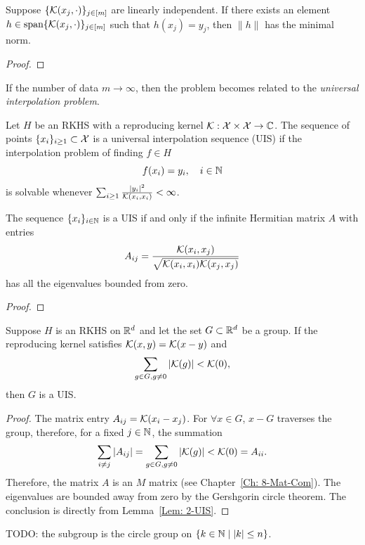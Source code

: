 \begin{theorem}
    Suppose $\{\mathcal K(x_j, \cdot)\}_{j\in [m]}$ are linearly independent. If there exists an element $h\in \textrm{span}\{ \mathcal K(x_j,\cdot)\}_{j\in[m]}$ such that $h(x_j) = y_j$, then $\|h\|$ has the minimal norm.
\end{theorem}
\begin{proof}
    
\end{proof}
If the number of data $m\to\infty$, then the problem becomes related to the \emph{universal interpolation problem}. 
\begin{definition}
    Let $H$ be an RKHS with a reproducing kernel $\mathcal K:\mathcal X\times\mathcal X\to \mathbb C$. The sequence of points $\{x_i\}_{i\ge 1}\subset \mathcal X$ is a universal interpolation sequence (UIS) if the interpolation problem of finding $f\in H$ 
    \begin{equation}
        f(x_i) = y_i,\quad i \in\mathbb N
    \end{equation}
    is solvable whenever $\sum_{i\ge 1} \frac{|y_i|^2}{\mathcal K(x_i, x_i)} < \infty$. 
\end{definition}
\begin{lemma}
\label{Lem: 2-UIS}
    The sequence $\{x_i\}_{i\in\mathbb N}$ is a UIS if and only if the infinite Hermitian matrix $A$ with entries \begin{equation}
        A_{ij} = \frac{\mathcal K(x_i, x_j)}{\sqrt{\mathcal K(x_i, x_i)\mathcal K(x_j, x_j)}}
\end{equation} has all the eigenvalues bounded from zero. 
\end{lemma}
\begin{proof}
    
\end{proof}
\begin{corollary}
    Suppose $H$ is an RKHS on $\mathbb R^d$ and let the set $G\subset \mathbb R^d$ be a group. If the reproducing kernel satisfies $\mathcal K(x, y) = \mathcal K(x - y)$ and  
    $$\sum_{g\in G, g\neq 0}|\mathcal K(g)| < \mathcal K(0),$$
    then $G$ is a UIS.
\end{corollary}
\begin{proof}
    The matrix entry $A_{ij} = \mathcal K(x_i - x_j)$. For $\forall x\in G$, $x - G$ traverses the group, therefore, for a fixed $j\in\mathbb N$, the summation
    \begin{equation}
        \sum_{i\neq j}|A_{ij}| = \sum_{g\in G, g\neq 0} |\mathcal K(g)| < \mathcal K(0) = A_{ii}. 
    \end{equation}
    Therefore, the matrix $A$ is an $M$ matrix (see Chapter~\ref{Ch: 8-Mat-Com}). The eigenvalues are bounded away from zero by the Gershgorin circle theorem. The conclusion is directly from Lemma~\ref{Lem: 2-UIS}.
\end{proof}
\begin{example}
    TODO: the subgroup is the circle group on $\{k\in\mathbb N\mid |k|\le n\}$. 
\end{example}
